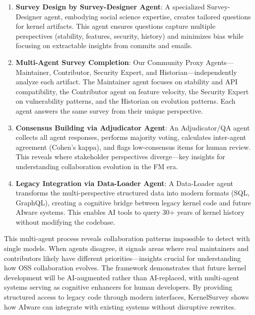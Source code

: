 \begin{enumerate}
    \item \textbf{Survey Design by Survey-Designer Agent}: A specialized Survey-Designer agent, embodying social science expertise, creates tailored questions for kernel artifacts. This agent ensures questions capture multiple perspectives (stability, features, security, history) and minimizes bias while focusing on extractable insights from commits and emails.

    \item \textbf{Multi-Agent Survey Completion}: Our Community Proxy Agents—Maintainer, Contributor, Security Expert, and Historian—independently analyze each artifact. The Maintainer agent focuses on stability and API compatibility, the Contributor agent on feature velocity, the Security Expert on vulnerability patterns, and the Historian on evolution patterns. Each agent answers the same survey from their unique perspective.

    \item \textbf{Consensus Building via Adjudicator Agent}: An Adjudicator/QA agent collects all agent responses, performs majority voting, calculates inter-agent agreement (Cohen's kappa), and flags low-consensus items for human review. This reveals where stakeholder perspectives diverge—key insights for understanding collaboration evolution in the FM era.

    \item \textbf{Legacy Integration via Data-Loader Agent}: A Data-Loader agent transforms the multi-perspective structured data into modern formats (SQL, GraphQL), creating a cognitive bridge between legacy kernel code and future AIware systems. This enables AI tools to query 30+ years of kernel history without modifying the codebase.

\end{enumerate}

This multi-agent process reveals collaboration patterns impossible to detect with single models. When agents disagree, it signals areas where real maintainers and contributors likely have different priorities—insights crucial for understanding how OSS collaboration evolves. The framework demonstrates that future kernel development will be AI-augmented rather than AI-replaced, with multi-agent systems serving as cognitive enhancers for human developers. By providing structured access to legacy code through modern interfaces, KernelSurvey shows how AIware can integrate with existing systems without disruptive rewrites.

